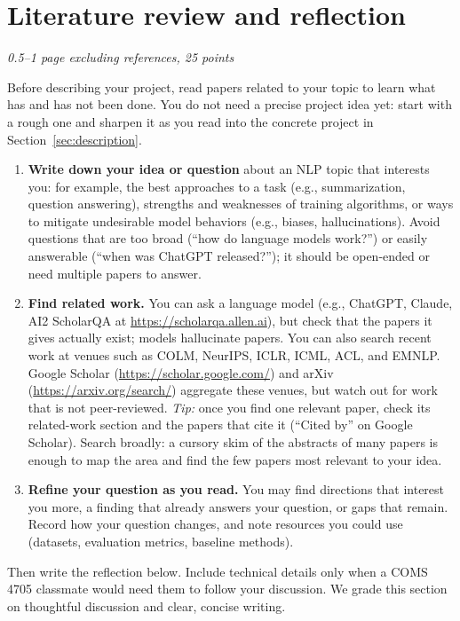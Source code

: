 \documentclass{article}
\newcommand{\note}[1]{#1}
\begin{document}
\section{Literature review and reflection}
\note{\textit{0.5--1 page excluding references, 25 points}}

\begin{instructions}
Before describing your project, read papers related to your topic to learn what has and has not been done. You do not need a precise project idea yet: start with a rough one and sharpen it as you read into the concrete project in Section~\ref{sec:description}.
\begin{enumerate}
    \item \textbf{Write down your idea or question} about an NLP topic that interests you: for example, the best approaches to a task (e.g., summarization, question answering), strengths and weaknesses of training algorithms, or ways to mitigate undesirable model behaviors (e.g., biases, hallucinations). Avoid questions that are too broad (``how do language models work?'') or easily answerable (``when was ChatGPT released?''); it should be open-ended or need multiple papers to answer.
    \item \textbf{Find related work.} You can ask a language model (e.g., ChatGPT, Claude, AI2 ScholarQA at \url{https://scholarqa.allen.ai}), but check that the papers it gives actually exist; models hallucinate papers. You can also search recent work at venues such as COLM, NeurIPS, ICLR, ICML, ACL, and EMNLP. Google Scholar (\url{https://scholar.google.com/}) and arXiv (\url{https://arxiv.org/search/}) aggregate these venues, but watch out for work that is not peer-reviewed. \textit{Tip:} once you find one relevant paper, check its related-work section and the papers that cite it (``Cited by'' on Google Scholar). Search broadly: a cursory skim of the abstracts of many papers is enough to map the area and find the few papers most relevant to your idea.
    \item \textbf{Refine your question as you read.} You may find directions that interest you more, a finding that already answers your question, or gaps that remain. Record how your question changes, and note resources you could use (datasets, evaluation metrics, baseline methods).
\end{enumerate}
Then write the reflection below. Include technical details only when a COMS 4705 classmate would need them to follow your discussion. We grade this section on thoughtful discussion and clear, concise writing.
\end{instructions}
\end{document}
